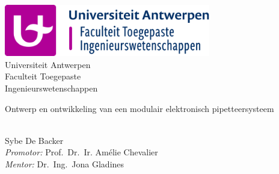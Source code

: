 \documentclass[a4paper,11pt,oneside]{book}
\begin{document}
    
    \frontmatter
    
    \begin{titlepage}      
        \begin{center}
            \includegraphics[width=9cm]{figures/LogoFaculteit.png}\\[0.5cm]
            {\LARGE Universiteit Antwerpen\\[0.5cm]
            Faculteit Toegepaste\\ Ingenieurswetenschappen}\\[2cm]
			
            \linespread{1.2}\huge {
                Ontwerp en ontwikkeling van een modulair elektronisch pipetteersysteem
            
            }
            \linespread{1}~\\[2cm]
            {\Large 
                Sybe De Backer
            }\\[1cm] 
            

            {\large 
                \emph{Promotor:} Prof.\ Dr.\ Ir. Amélie Chevalier\\
                \emph{Mentor:} Dr.\ Ing.\ Jona Gladines}\\[1cm] %
            

\end{center}
\end{titlepage}
\end{document}
